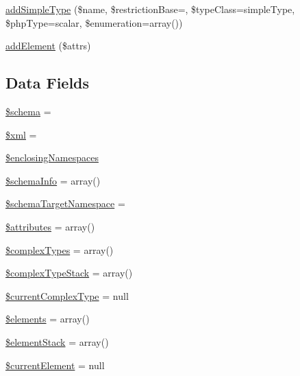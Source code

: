 \begin{DoxyCompactItemize}
\item 
\hyperlink{classnusoap__xmlschema_a31228a55d8cdb602e32f481406e7455c}{add\+Simple\+Type} (\$name, \$restriction\+Base=\textquotesingle{}\textquotesingle{}, \$type\+Class=\textquotesingle{}simple\+Type\textquotesingle{}, \$php\+Type=\textquotesingle{}scalar\textquotesingle{}, \$enumeration=array())
\item 
\hyperlink{classnusoap__xmlschema_a7341d393047f63fdcb50dd44d2eff448}{add\+Element} (\$attrs)
\end{DoxyCompactItemize}
\subsection*{Data Fields}
\begin{DoxyCompactItemize}
\item 
\hyperlink{classnusoap__xmlschema_a83022b1d70799d2bde3d64dca9cb40ee}{\$schema} = \textquotesingle{}\textquotesingle{}
\item 
\hyperlink{classnusoap__xmlschema_aa108d9d91e700ac530401dd363b0723b}{\$xml} = \textquotesingle{}\textquotesingle{}
\item 
\hyperlink{classnusoap__xmlschema_a4ed6b922bbc98b7b09a14bbf141e0ada}{\$enclosing\+Namespaces}
\item 
\hyperlink{classnusoap__xmlschema_a3c87187fdb02d5c69ab1659f5c9a1099}{\$schema\+Info} = array()
\item 
\hyperlink{classnusoap__xmlschema_a0b39c1afa0ee87e3ee1611e3325ad28d}{\$schema\+Target\+Namespace} = \textquotesingle{}\textquotesingle{}
\item 
\hyperlink{classnusoap__xmlschema_adc851f7a62250e75df0490c0280aef4c}{\$attributes} = array()
\item 
\hyperlink{classnusoap__xmlschema_acf1dbaf5ad35f659428a61193928b78d}{\$complex\+Types} = array()
\item 
\hyperlink{classnusoap__xmlschema_aa99207ae2f6e513f071e064ed93d6e43}{\$complex\+Type\+Stack} = array()
\item 
\hyperlink{classnusoap__xmlschema_aaa10b6abe9a98459054311aae8844fab}{\$current\+Complex\+Type} = null
\item 
\hyperlink{classnusoap__xmlschema_ad18dd8fbe31b294e2bc4711dcde4548d}{\$elements} = array()
\item 
\hyperlink{classnusoap__xmlschema_a9611ba868e9813aad53a75e370eef276}{\$element\+Stack} = array()
\item 
\hyperlink{classnusoap__xmlschema_a9804037add953a13a31d6ae239528c63}{\$current\+Element} = null

\end{DoxyCompactItemize}
